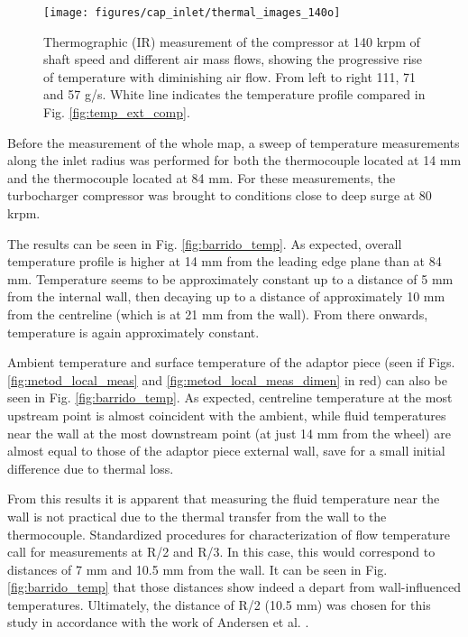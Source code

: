 \begin{figure}[!b]
\centering
\texttt{[image: figures/cap\_inlet/thermal\_images\_140o]}
\caption{Thermographic (IR) measurement of the compressor at 140 krpm of shaft speed and different air mass flows, showing the progressive rise of temperature with diminishing air flow. From left to right 111, 71 and 57 g/s. White line indicates the temperature profile compared in Fig. \ref{fig:temp_ext_comp}.}
\label{fig:thermal_images}
\end{figure}

Before the measurement of the whole map, a sweep of temperature measurements along the inlet radius was performed for both the thermocouple located at 14 mm and the thermocouple located at 84 mm. For these measurements, the turbocharger compressor was brought to conditions close to deep surge at 80 krpm.

The results can be seen in Fig. \ref{fig:barrido_temp}. As expected, overall temperature profile is higher at 14 mm from the leading edge plane than at 84 mm. Temperature seems to be approximately constant up to a distance of 5 mm from the internal wall, then decaying up to a distance of approximately 10 mm from the centreline (which is at 21 mm from the wall). From there onwards, temperature is again approximately constant.

Ambient temperature and surface temperature of the adaptor piece (seen if Figs. \ref{fig:metod_local_meas} and \ref{fig:metod_local_meas_dimen} in red) can also be seen in Fig. \ref{fig:barrido_temp}. As expected, centreline temperature at the most upstream point is almost coincident with the ambient, while fluid temperatures near the wall at the most downstream point (at just 14 mm from the wheel) are almost equal to those of the adaptor piece external wall, save for a small initial difference due to thermal loss.

From this results it is apparent that measuring the fluid temperature near the wall is not practical due to the thermal transfer from the wall to the thermocouple. Standardized procedures for characterization of flow temperature call for measurements at R/2 and R/3. In this case, this would correspond to distances of 7 mm and 10.5 mm from the wall. It can be seen in Fig. \ref{fig:barrido_temp} that those distances show indeed a depart from wall-influenced temperatures. Ultimately, the distance of R/2 (10.5 mm) was chosen for this study in accordance with the work of Andersen et al. \cite{andersen2009surge}.

